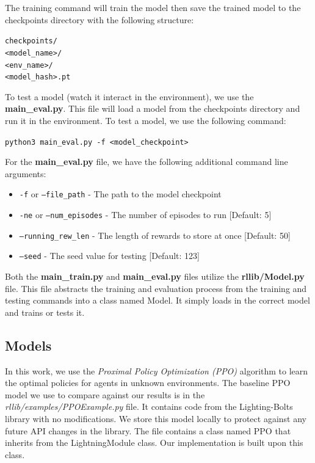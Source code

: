 \documentclass[conference]{IEEEtran}
\begin{document}
The training command will train the model then save the trained model to the checkpoints directory with the following structure:
\begin{center}
    \texttt{checkpoints/\\<model\_name>/\\<env\_name>/\\<model\_hash>.pt}
\end{center}

To test a model (watch it interact in the environment), we use the \textbf{main\_eval.py}. This file will load a model from the checkpoints directory and
run it in the environment.
To test a model, we use the following command:
\begin{center}
    \texttt{python3 main\_eval.py -f <model\_checkpoint>}
\end{center}

For the \textbf{main\_eval.py} file, we have the following additional command line arguments:
\begin{itemize}
    \item \texttt{-f} or \texttt{--file\_path} - The path to the model checkpoint
    \item \texttt{-ne} or \texttt{--num\_episodes} - The number of episodes to run [Default: 5]
    \item \texttt{--running\_rew\_len} - The length of rewards to store at once [Default: 50]
    \item \texttt{--seed} - The seed value for testing [Default: 123]
\end{itemize}

Both the \textbf{main\_train.py} and \textbf{main\_eval.py} files utilize the \textbf{rllib/Model.py} file.
This file abstracts the training and evaluation process from the training and testing commands into a class named Model.
It simply loads in the correct model and trains or tests it.

\subsection{Models}


In this work, we use the \textit{Proximal Policy Optimization (PPO)} algorithm to learn the optimal policies for agents in unknown environments. The baseline PPO model we use to compare against our results is in the \textit{rllib/examples/PPOExample.py} file. It contains code from the Lighting-Bolts library with no modifications. We store this model locally to protect against any future API changes in the library. The file contains a class named PPO that inherits from the LightningModule class. Our implementation is built upon this class.
\end{document}
